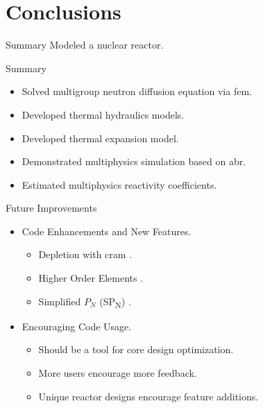 \section{Conclusions}
\label{sec:conclusions}

\begin{frame}{Summary}
  \huge Modeled a nuclear reactor.
\end{frame}

\begin{frame}{Summary}
  \begin{itemize}
    \item Solved multigroup neutron diffusion equation via \gls{fem}.
    \item Developed thermal hydraulics models.
    \item Developed thermal expansion model.
    \item Demonstrated multiphysics simulation based on \gls{abr}.
    \item Estimated multiphysics reactivity coefficients.
  \end{itemize}
\end{frame}

\begin{frame}{Future Improvements}
  \begin{itemize}
    \item Code Enhancements and New Features.
    \begin{itemize}
      \item Depletion with \gls{cram} \cite{cram}.
      \item Higher Order Elements \cite{Hosseini2013}.
      \item Simplified $P_N$ (SP\textsubscript{N}) \cite{Ryu2013}. %
    \end{itemize}
    \item Encouraging Code Usage.
    \begin{itemize}
      \item Should be a tool for core design optimization.
      \item More users encourage more feedback.
      \item Unique reactor designs encourage feature additions.
    \end{itemize}
  \end{itemize}
\end{frame}
